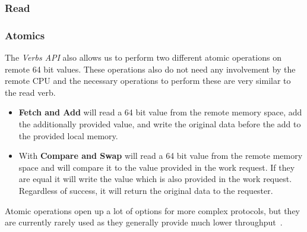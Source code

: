 \subsubsection{Read}

\subsubsection{Atomics}

The \emph{Verbs API} also allows us to perform two different atomic operations on remote 64 bit values. These operations also
do not need any involvement by the remote CPU and the necessary operations to perform these are very similar to the read verb.


\begin{itemize}
  \item \textbf{Fetch and Add} will read a 64 bit value from the remote memory space, add the additionally provided 
     value, and write the original data before the add to the provided local memory.
  \item With \textbf{Compare and Swap} will read a 64 bit value from the remote memory space and will compare it to 
    the  value provided in the work request. If they are equal it will write the value 
    which is also provided in the work request. Regardless of success, it will return the original data to the requester.
\end{itemize}

Atomic operations open up a lot of options for more complex protocols, but they are currently rarely used as they generally
provide much lower throughput~\cite{anuj-guide}.


